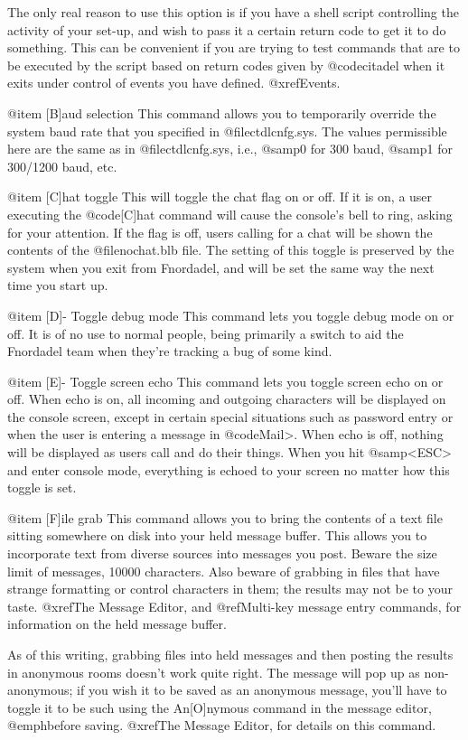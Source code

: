 The only real reason to use this option is if you have a shell
script controlling the activity of your set-up, and wish to pass it a
certain return code to get it to do something.  This can be convenient
if you are trying to test commands that are to be executed by the
script based on return codes given by @code{citadel} when it exits under
control of events you have defined.  @xref{Events}.

@item [B]aud selection
This command allows you to
temporarily override the system baud rate that you specified in
@file{ctdlcnfg.sys}.  The values permissible here are the same as in
@file{ctdlcnfg.sys}, i.e., @samp{0} for 300 baud, @samp{1} for
300/1200 baud, etc.

@item [C]hat toggle
This will toggle the chat flag on or off.  If it is on,
a user executing the @code{[C]hat} command will cause the console's bell to
ring, asking for your attention.  If the flag is off, users calling
for a chat will be shown the contents of the @file{nochat.blb} file.  The
setting of this toggle is preserved by the system when you exit from
Fnordadel, and will be set the same way the next time you start up.

@item [D]- Toggle debug mode
This command lets you toggle debug mode on or off.  It is of no
use to normal people, being primarily a switch to aid the Fnordadel
team when they're tracking a bug of some kind.

@item [E]- Toggle screen echo
This command lets you toggle screen echo on or off.  When echo is on,
all incoming and outgoing characters will be displayed on the console
screen, except in certain special situations such as password entry or
when the user is entering a message in @code{Mail>}.
When echo is off, nothing will be
displayed as users call and do their things.  When you hit @samp{<ESC>}
and enter console mode, everything is echoed to your screen no
matter how this toggle is set.

@item [F]ile grab
This command allows you to bring the contents of a text file
sitting somewhere on disk into your held message
buffer.  This allows you to incorporate text from diverse sources
into messages you post.  Beware the size limit of messages, 10000
characters.  Also beware of grabbing in files that have strange
formatting or control characters in them; the results may not be to
your taste.
@xref{The Message Editor}, and @ref{Multi-key message entry commands},
for information on the held message buffer.

As of this writing, grabbing files into held messages and
then posting the results in anonymous rooms doesn't work quite right.
The message will pop up as non-anonymous; if you wish it to be saved
as an anonymous message, you'll have to toggle it to be such using
the An[O]nymous command in the message editor, @emph{before} saving.
@xref{The Message Editor}, for details on this command.

